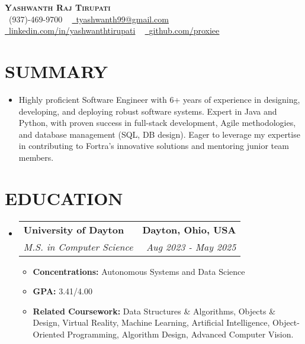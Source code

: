 \documentclass[letterpaper,11pt]{article}
\makeatletter
\newcommand{\resumeItem}[1]{\item\small{{#1 \vspace{-2pt}}}}
\newcommand{\resumeSubheading}[4]{\vspace{-2pt}\item\begin{tabular*}{0.97\textwidth}[t]{l@{\extracolsep{\fill}}r}\textbf{#1} & #2 \\\textit{\small#3} & \textit{\small #4} \\\end{tabular*}\vspace{-7pt}}
\newcommand{\resumeSubHeadingListStart}{\begin{itemize}[leftmargin=0.15in, label={}]}
\newcommand{\resumeSubHeadingListEnd}{\end{itemize}}
\newcommand{\resumeItemListStart}{\begin{itemize}}
\newcommand{\resumeItemListEnd}{\end{itemize}\vspace{-5pt}}
\makeatother
\begin{document}
\begin{center}
    \textbf{\Huge \scshape {\fontsize{15pt}{20pt}\selectfont Yashwanth Raj Tirupati} }\\ \vspace{1pt}
    \small \raisebox{-0.1\height}\faPhone\ (937)-469-9700 ~ \href{mailto:tyashwanth99@gmail.com}{\raisebox{-0.2\height}\faEnvelope\  \underline{tyashwanth99@gmail.com}} ~ 
    \href{https://linkedin.com/in/yashwanthtirupati}{\raisebox{-0.2\height}\faLinkedin\ \underline{linkedin.com/in/yashwanthtirupati}} ~ 
    \href{https://github.com/proxiee}{\raisebox{-0.2\height}\faGithub\ \underline{github.com/proxiee}}
    \vspace{-8pt}
\end{center}

\section{{\fontsize{9pt}{20pt}\selectfont \textbf{SUMMARY}}}
\resumeSubHeadingListStart
\resumeItem{Highly proficient Software Engineer with 6+ years of experience in designing, developing, and deploying robust software systems.  Expert in Java and Python, with proven success in full-stack development, Agile methodologies, and database management (SQL, DB design).  Eager to leverage my expertise in contributing to Fortra's innovative solutions and mentoring junior team members.}
\resumeSubHeadingListEnd
\vspace{-18pt}

\section{{\fontsize{9pt}{20pt}\selectfont \textbf{EDUCATION}}}
\resumeSubHeadingListStart
\resumeSubheading{University of Dayton}{\textbf{Dayton, Ohio, USA}}{M.S. in Computer Science}{Aug 2023 - May 2025}
\resumeItemListStart
\resumeItem{\textbf{Concentrations:} Autonomous Systems and Data Science}
\resumeItem{\textbf{GPA:} 3.41/4.00}
\resumeItem{\textbf{Related Coursework:} Data Structures \& Algorithms, Objects \& Design, Virtual Reality, Machine Learning, Artificial Intelligence, Object-Oriented Programming, Algorithm Design, Advanced Computer Vision.}
\resumeItemListEnd
\resumeSubHeadingListEnd
\vspace{-18pt}
\end{document}
